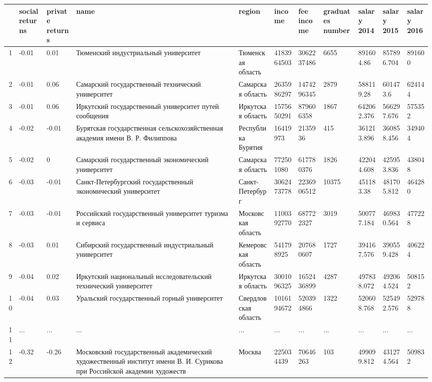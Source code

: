 \documentclass[alpha-refs]{wiley-article-05g}
\begin{document}
\begin{table}[ht]
	\centering
	\begin{tabular}{rllllllllll}
		\hline
		& social returns & private returns & name & region & income & fee income & graduates number & salary 2014 & salary 2015 & salary 2016 \\ 
		\hline
		1 & -0.01 & 0.01 & Тюменский индустриальный университет & Тюменская область & 4183964503 & 3062237486 & 6655 & 891604.86 & 857896.704 & 891600 \\ 
		2 & -0.01 & 0.06 & Самарский государственный технический университет & Самарская область & 2635986297 & 1474296345 & 2879 & 588119.28 & 601473.6 & 624144 \\ 
		3 & -0.01 & 0.06 & Иркутский государственный университет путей сообщения & Иркутская область & 1575650291 & 879606358 & 1867 & 642062.376 & 566297.676 & 575352 \\ 
		4 & -0.02 & -0.01 & Бурятская государственная сельскохозяйственная академия имени В. Р. Филиппова & Республика Бурятия & 16419973 & 2135936 & 415 & 361213.896 & 360858.456 & 349404 \\ 
		5 & -0.02 & 0 & Самарский государственный экономический университет & Самарская область & 772501080 & 617780376 & 1826 & 422044.608 & 425953.836 & 438048 \\ 
		6 & -0.03 & -0.01 & Санкт-Петербургский государственный экономический университет & Санкт-Петербург & 3062473778 & 2236906512 & 10375 & 451183.38 & 481705.812 & 464280 \\ 
		7 & -0.03 & -0.01 & Российский государственный университет туризма и сервиса & Московская область & 1100392770 & 687722327 & 3019 & 500777.184 & 469830.564 & 477228 \\ 
		8 & -0.03 & 0.01 & Сибирский государственный индустриальный университет & Кемеровская область & 541798925 & 207680607 & 1727 & 394167.576 & 390559.428 & 406224 \\ 
		9 & -0.04 & 0.02 & Иркутский национальный исследовательский технический университет & Иркутская область & 3001096325 & 1652436899 & 4287 & 497838.072 & 492064.524 & 508152 \\ 
		10 & -0.04 & 0.03 & Уральский государственный горный университет & Свердловская область & 1016194672 & 520394866 & 1322 & 520608.768 & 525492.576 & 529788 \\ 
		11 & ... & ... & ... & ... & ... & ... & ... & ... & ... & ... \\ 
		12 & -0.32 & -0.26 & Московский государственный академический художественный институт имени В. И. Сурикова при Российской академии художеств & Москва & 225034439 & 70646263 & 103 & 499099.812 & 431274.564 & 509832 \\ 

\end{tabular}
\end{table}
\end{document}

